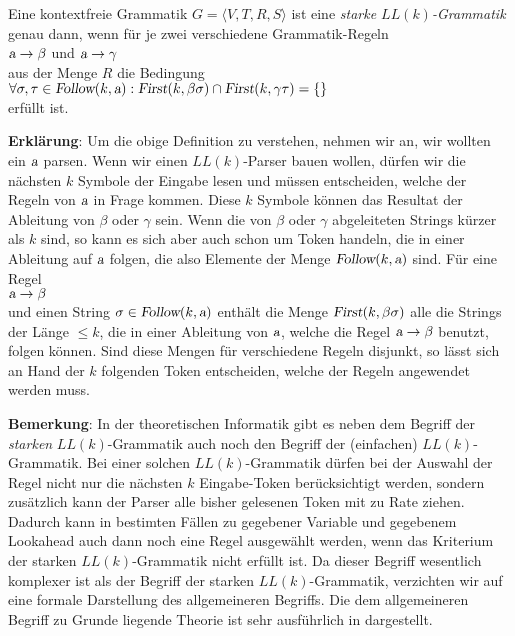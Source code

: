 \begin{Definition}
  Eine kontextfreie Grammatik $G = \langle V, T, R, S \rangle$ ist eine 
  \emph{starke $LL(k)$-Grammatik} genau dann, wenn für je zwei verschiedene Grammatik-Regeln
  \\[0.2cm]
  \hspace*{1.3cm}
  $\textsl{a} \rightarrow \beta$ \quad und \quad $\textsl{a} \rightarrow \gamma$
  \\[0.2cm]
  aus der Menge $R$ die Bedingung 
  \\[0.2cm]
  \hspace*{1.3cm}
  $\forall \sigma, \tau \in \textsl{Follow}(k, \textsl{a}): 
   \textsl{First}(k, \beta \sigma) \cap \textsl{First}(k, \gamma \tau) = \{\}$
  \\[0.2cm]
  erfüllt ist. \eox
\end{Definition}

\noindent
\textbf{Erklärung}:  Um die obige Definition zu verstehen, nehmen wir an, wir wollten ein $\textsl{a}$ parsen.
Wenn wir einen $LL(k)$-Parser bauen wollen, dürfen wir die nächsten $k$ Symbole der Eingabe lesen
und müssen entscheiden, welche der Regeln von $\textsl{a}$ in Frage kommen.  Diese $k$ Symbole können das
Resultat der Ableitung von $\beta$ oder $\gamma$ sein.  Wenn die von $\beta$ oder $\gamma$
abgeleiteten Strings kürzer als $k$ sind, so kann es sich aber auch schon um Token
handeln, die in einer Ableitung auf $\textsl{a}$ folgen, die also Elemente der Menge
$\textsl{Follow}(k,\textsl{a})$ sind.  Für eine Regel
\\[0.2cm]
\hspace*{1.3cm}
$\textsl{a} \rightarrow \beta$
\\[0.2cm]
und einen String $\sigma \in \textsl{Follow}(k,\textsl{a})$
enthält die Menge $\textsl{First}(k, \beta \sigma)$ alle die Strings der Länge
$\leq k$, die in einer Ableitung von $\textsl{a}$, welche die Regel $\textsl{a} \rightarrow \beta$ benutzt,
folgen können.  Sind diese Mengen für verschiedene Regeln disjunkt, so lässt sich an Hand der
$k$ folgenden Token entscheiden, welche der Regeln angewendet werden muss.
\vspace*{0.2cm}

\noindent
\textbf{Bemerkung}:
In der theoretischen Informatik gibt es neben dem Begriff der \emph{starken} $LL(k)$-Grammatik auch
noch den Begriff der (einfachen) $LL(k)$-Grammatik.  Bei einer solchen $LL(k)$-Grammatik dürfen bei
der Auswahl der Regel nicht nur die nächsten $k$ Eingabe-Token berücksichtigt werden, sondern
zusätzlich kann der Parser alle bisher gelesenen Token mit zu Rate ziehen.  
Dadurch kann in bestimten Fällen zu gegebener Variable und gegebenem Lookahead auch dann
noch eine Regel ausgewählt werden, wenn das Kriterium der starken $LL(k)$-Grammatik nicht
erfüllt ist.
Da dieser Begriff
wesentlich komplexer ist als der Begriff der
starken $LL(k)$-Grammatik, verzichten wir auf eine formale Darstellung des
allgemeineren Begriffs.  
Die dem allgemeineren Begriff zu Grunde liegende Theorie ist sehr ausführlich in
\cite{aho:72} dargestellt. 

